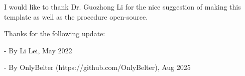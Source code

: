 I would like to thank Dr. Guozhong Li for the nice suggestion of making this template as well as the procedure open-source.

Thanks for the following update:

- By Li Lei, May 2022


- By OnlyBelter (https://github.com/OnlyBelter), Aug 2025
